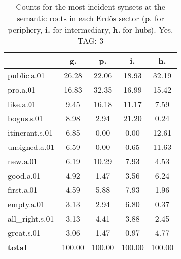 \begin{table}[h!]
\begin{center}
\begin{tabular}{| l | c | c | c | c |}\hline
 & g. & p. & i. & h. \\\hline
public.a.01 & 26.28  & 22.06  & 18.93  & 32.19 \\\hline
pro.a.01 & 16.83  & 32.35  & 16.99  & 15.42 \\\hline
like.a.01 & 9.45  & 16.18  & 11.17  & 7.59 \\\hline
bogus.s.01 & 8.98  & 2.94  & 21.20  & 0.24 \\\hline
itinerant.s.01 & 6.85  & 0.00  & 0.00  & 12.61 \\\hline
unsigned.a.01 & 6.59  & 0.00  & 0.65  & 11.63 \\\hline
new.a.01 & 6.19  & 10.29  & 7.93  & 4.53 \\\hline
good.a.01 & 4.92  & 1.47  & 3.56  & 6.24 \\\hline
first.a.01 & 4.59  & 5.88  & 7.93  & 1.96 \\\hline
empty.a.01 & 3.13  & 2.94  & 6.80  & 0.37 \\\hline
all\_right.s.01 & 3.13  & 4.41  & 3.88  & 2.45 \\\hline
great.s.01 & 3.06  & 1.47  & 0.97  & 4.77 \\\hline
{{\bf total}} & 100.00  & 100.00  & 100.00  & 100.00 \\\hline
\end{tabular}
\caption{Counts for the most incident synsets at the semantic roots in each Erd\"os sector ({\bf p.} for periphery, {\bf i.} for intermediary, {\bf h.} for hubs). Yes. TAG: 3}
\end{center}
\end{table}